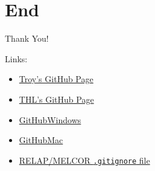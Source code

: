 \documentclass[10pt,t,xcolor=table]{UWMadBeamer}
\begin{document}
\section{End}
    \begin{frame}{Thank You!}

        Links:
        \begin{itemize}
            \setlength{\itemsep}{2em}
            \item   {
                \href{https://github.com/troyhaskin} {Troy's GitHub Page}
            }
            \item   {
                \href{https://github.com/ThermalHydraulicsLab} {THL's GitHub Page}
            }
            \item   {
                \href{https://windows.github.com/} {GitHubWindows}
            }
            \item   {
                \href{https://mac.github.com/} {GitHubMac}
            }
            \item   {
                \href{https://raw.githubusercontent.com/ThermalHydraulicsLab/UWMadisonExperiment-RELAP5/master/.gitignore} {RELAP/MELCOR \texttt{.gitignore} file}
            }
        \end{itemize}

    \end{frame}
\end{document}
